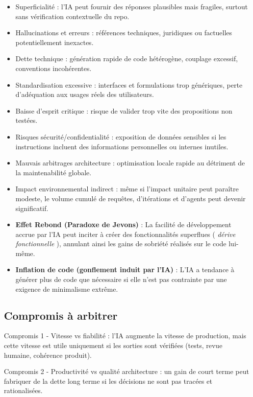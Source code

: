 \documentclass[
  10pt,
  a4paper,
  DIV=11,
  numbers=noendperiod,
  oneside]{scrreprt}
\let\oldtextbf\textbf
\renewcommand{\textbf}[1]{\oldtextbf{\textcolor{cmmnavy}{#1}}}
\let\oldemph\emph
\renewcommand{\emph}[1]{\oldemph{\textcolor{cmmgray}{#1}}}
\begin{document}
\begin{itemize}
\item
  Superficialité : l'IA peut fournir des réponses plausibles mais
  fragiles, surtout sans vérification contextuelle du repo.
\item
  Hallucinations et erreurs : références techniques, juridiques ou
  factuelles potentiellement inexactes.
\item
  Dette technique : génération rapide de code hétérogène, couplage
  excessif, conventions incohérentes.
\item
  Standardisation excessive : interfaces et formulations trop
  génériques, perte d'adéquation aux usages réels des utilisateurs.
\item
  Baisse d'esprit critique : risque de valider trop vite des
  propositions non testées.
\item
  Risques sécurité/confidentialité : exposition de données sensibles si
  les instructions incluent des informations personnelles ou internes
  inutiles.
\item
  Mauvais arbitrages architecture : optimisation locale rapide au
  détriment de la maintenabilité globale.
\item
  Impact environnemental indirect : même si l'impact unitaire peut
  paraître modeste, le volume cumulé de requêtes, d'itérations et
  d'agents peut devenir significatif.
\item
  \textbf{Effet Rebond (Paradoxe de Jevons)} : La facilité de
  développement accrue par l'IA peut inciter à créer des fonctionnalités
  superflues ( \emph{dérive fonctionnelle} ), annulant ainsi les gains
  de sobriété réalisés sur le code lui-même.
\item
  \textbf{Inflation de code (gonflement induit par l'IA)} : L'IA a
  tendance à générer plus de code que nécessaire si elle n'est pas
  contrainte par une exigence de minimalisme extrême.
\end{itemize}

\subsection{Compromis à arbitrer}\label{compromis-uxe0-arbitrer}

Compromis 1 - Vitesse vs fiabilité : l'IA augmente la vitesse de
production, mais cette vitesse est utile uniquement si les sorties sont
vérifiées (tests, revue humaine, cohérence produit).

Compromis 2 - Productivité vs qualité architecture : un gain de court
terme peut fabriquer de la dette long terme si les décisions ne sont pas
tracées et rationalisées.
\end{document}
